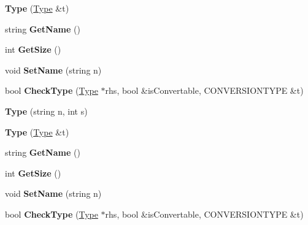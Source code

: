 \begin{DoxyCompactItemize}
\item 
\hypertarget{classType_a617481e51492ea14507c83d5dba2cce5}{{\bfseries Type} (\hyperlink{classType}{Type} \&t)}\label{classType_a617481e51492ea14507c83d5dba2cce5}

\item 
\hypertarget{classType_a8143fe4686ae1a5709a5955396c6ee26}{string {\bfseries Get\-Name} ()}\label{classType_a8143fe4686ae1a5709a5955396c6ee26}

\item 
\hypertarget{classType_afe0fca035825759785b525d2a24f69fe}{int {\bfseries Get\-Size} ()}\label{classType_afe0fca035825759785b525d2a24f69fe}

\item 
\hypertarget{classType_ab8d2328a3a76289edf42b9bf0d4f278f}{void {\bfseries Set\-Name} (string n)}\label{classType_ab8d2328a3a76289edf42b9bf0d4f278f}

\item 
\hypertarget{classType_a2574b17ddc03d5ca13309811d06f1a56}{bool {\bfseries Check\-Type} (\hyperlink{classType}{Type} $\ast$rhs, bool \&is\-Convertable, C\-O\-N\-V\-E\-R\-S\-I\-O\-N\-T\-Y\-P\-E \&t)}\label{classType_a2574b17ddc03d5ca13309811d06f1a56}

\item 
\hypertarget{classType_a0ec88e19865012d53e20b97677218783}{{\bfseries Type} (string n, int s)}\label{classType_a0ec88e19865012d53e20b97677218783}

\item 
\hypertarget{classType_a617481e51492ea14507c83d5dba2cce5}{{\bfseries Type} (\hyperlink{classType}{Type} \&t)}\label{classType_a617481e51492ea14507c83d5dba2cce5}

\item 
\hypertarget{classType_a8143fe4686ae1a5709a5955396c6ee26}{string {\bfseries Get\-Name} ()}\label{classType_a8143fe4686ae1a5709a5955396c6ee26}

\item 
\hypertarget{classType_afe0fca035825759785b525d2a24f69fe}{int {\bfseries Get\-Size} ()}\label{classType_afe0fca035825759785b525d2a24f69fe}

\item 
\hypertarget{classType_ab8d2328a3a76289edf42b9bf0d4f278f}{void {\bfseries Set\-Name} (string n)}\label{classType_ab8d2328a3a76289edf42b9bf0d4f278f}

\item 
\hypertarget{classType_a2574b17ddc03d5ca13309811d06f1a56}{bool {\bfseries Check\-Type} (\hyperlink{classType}{Type} $\ast$rhs, bool \&is\-Convertable, C\-O\-N\-V\-E\-R\-S\-I\-O\-N\-T\-Y\-P\-E \&t)}\label{classType_a2574b17ddc03d5ca13309811d06f1a56}


\end{DoxyCompactItemize}
